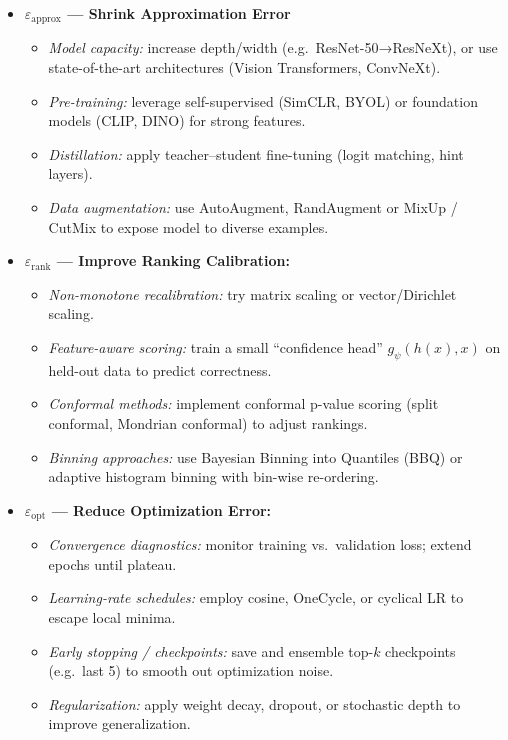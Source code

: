 \begin{itemize}[leftmargin=1.5em]

  \item \textbf{\(\varepsilon_{\text{approx}}\) — Shrink Approximation Error}
    \begin{itemize}[leftmargin=1.25em]
      \item \emph{Model capacity:} increase depth/width (e.g.\ ResNet-50→ResNeXt), or use state-of-the-art architectures (Vision Transformers, ConvNeXt).
      \item \emph{Pre-training:} leverage self-supervised (SimCLR, BYOL) or foundation models (CLIP, DINO) for strong features.
      \item \emph{Distillation:} apply teacher–student fine-tuning (logit matching, hint layers).
      \item \emph{Data augmentation:} use AutoAugment, RandAugment or MixUp / CutMix to expose model to diverse examples.
    \end{itemize}

  \item \textbf{\(\varepsilon_{\text{rank}}\) — Improve Ranking Calibration:}
    \begin{itemize}[leftmargin=1.25em]
      \item \emph{Non-monotone recalibration:} try matrix scaling or vector/Dirichlet scaling.
      \item \emph{Feature-aware scoring:} train a small “confidence head” \(g_\psi(h(x), x)\) on held-out data to predict correctness.
      \item \emph{Conformal methods:} implement conformal p-value scoring (split conformal, Mondrian conformal) to adjust rankings.
      \item \emph{Binning approaches:} use Bayesian Binning into Quantiles (BBQ) or adaptive histogram binning with bin-wise re-ordering.
    \end{itemize}

  \item \textbf{\(\varepsilon_{\text{opt}}\) — Reduce Optimization Error:}
    \begin{itemize}[leftmargin=1.25em]
      \item \emph{Convergence diagnostics:} monitor training vs.\ validation loss; extend epochs until plateau.
      \item \emph{Learning-rate schedules:} employ cosine, OneCycle, or cyclical LR to escape local minima.
      \item \emph{Early stopping / checkpoints:} save and ensemble top-\(k\) checkpoints (e.g.\ last 5) to smooth out optimization noise.
      \item \emph{Regularization:} apply weight decay, dropout, or stochastic depth to improve generalization.
    \end{itemize}


\end{itemize}

